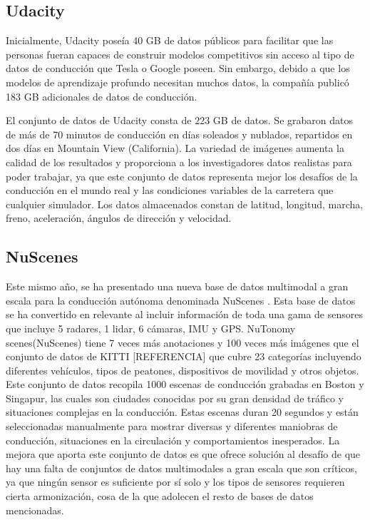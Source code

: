 \subsection{Udacity}

Inicialmente, Udacity  \cite{udacity-data} poseía 40 GB de datos públicos para facilitar que las personas fueran capaces de construir modelos competitivos sin acceso al tipo de datos de conducción que Tesla o Google poseen. Sin embargo, debido a que los modelos de aprendizaje profundo necesitan muchos datos, la compañía publicó 183 GB adicionales de datos de conducción.

El conjunto de datos de Udacity \cite{udacity-dataset} consta de 223 GB de datos. Se grabaron datos de más de 70 minutos de conducción en días soleados y nublados, repartidos en dos días en Mountain View (California). La variedad de imágenes aumenta la calidad de los resultados y proporciona a los investigadores datos realistas para poder trabajar, ya que este conjunto de datos representa mejor los desafíos de la conducción en el mundo real y las condiciones variables de la carretera que cualquier simulador. Los datos almacenados constan de latitud, longitud, marcha, freno, aceleración, ángulos de dirección y velocidad.

\subsection {NuScenes}

Este mismo año, se ha presentado una nueva base de datos multimodal a gran escala para la conducción autónoma denominada NuScenes \cite{nuscenes-dataset}. Esta base de datos se ha convertido en relevante al incluir información de toda una gama de sensores que incluye 5 radares, 1 lidar, 6 cámaras, IMU y GPS. NuTonomy scenes(NuScenes) tiene 7 veces más anotaciones y 100 veces más imágenes que el conjunto de datos de KITTI [REFERENCIA] que cubre 23 categorías incluyendo diferentes vehículos, tipos de peatones, dispositivos de movilidad y otros objetos.
Este conjunto de datos recopila 1000 escenas de conducción grabadas en Boston y Singapur, las cuales son ciudades conocidas por su gran densidad de tráfico y situaciones complejas en la conducción. Estas escenas duran 20 segundos y están seleccionadas manualmente para mostrar diversas y diferentes maniobras de conducción, situaciones en la circulación y comportamientos inesperados.
La mejora que aporta este conjunto de datos es que ofrece solución al desafío de que hay una falta de conjuntos de datos multimodales a gran escala que son críticos, ya que ningún sensor es suficiente por sí solo y los tipos de sensores requieren cierta armonización, cosa de la que adolecen el resto de bases de datos mencionadas.

